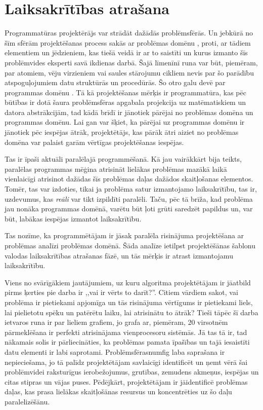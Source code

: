 \section{Laiksakrītības atrašana}
Programmatūras projektērājs var strādāt dažādās problēmsfērās. Un jebkūrā no
šīm sfērām projektēšanas process sakās ar problēmas domēnu ,
proti, ar tādiem elementiem un jēdzieniem, kas
tiešā veidā ir ar to saistīti un kurus izmanto šīs problēmvides eksperti savā
ikdienas darbā. Šajā līmenīnī runa var būt, piemēram, par atomiem, vēju virzieniem
vai saules stārojumu cikliem nevis par šo parādību atspoguļojumiem datu
struktūrās un procedūrās. Šo otro galu devē par programmas domēnu . Tā kā projektēšanas mērķis ir programmatūra, kas pēc būtības ir
dotā šaura problēmsfēras apgabala projekcija uz matēmatiskiem un datora abstrākcijām,
tad kādā brīdī ir jānotiek pārējai no problēmas domēna un programmas domēnu.
Lai gan var šķiet, ka pārējai uz programmas domēnu ir jānotiek pēc iespējas
ātrāk, projektētājs, kas pārāk ātri aiziet no problēmas domēna var palaist garām
vērtīgas projektēšanas iespējas.

Tas ir īpaši aktuāli paralēlajā programmēšanā. Kā jau vairākkārt bija teikts,
paralēlas programmas mēģina atrisināt
lielākas problēmas mazākā laikā vienlaicīgi atrisinot dažādas šīs problēmas daļas
dažādos skaitļošanas elementos. Tomēr, tas var izdoties, tikai ja problēma satur
izmantojamo laiksakrītību, tas ir, uzdevumus, kas \emph{reāli} var tikt izpildīti paralēli.
Taču, pēc tā brīža, kad problēma jau nonāka programmas domēnā, varētu būt ļoti grūti
saredzēt papildus un, var būt, labākas iespējas izmantot laiksakrītību.

Tas nozīme, ka programmētājam ir jāsak paralēla risinājuma projektēšana ar problēmas
analīzi problēmas domēnā. Šāda analīze ietilpst projektēšānas šablonu valodas
laiksakrītības atrašanas fāzē, un tās mērķis ir atrast izmantojamu laiksakrītību.

Viens no svārīgākiem jautājumiem, uz kuru algoritma projektētājam ir jāatbild
pirms ķerties pie darba ir ,,vai ir vērts to darīt?''. Citiem vārdiem sakot,
vai problēma ir pietiekami apjomīga un tās risinājuma vērtīgums ir pietiekami liels,
lai pielietotu spēku un patērētu laiku, lai atrisinātu to ātrāk? Tieši tāpēc šī
darba ietvaros runa ir par lieliem grafiem, jo grafa ar, piemēram, 20 virsotnēm pārmeklēšana
ir perfekti atrisinājama vienprocesoru sistēmās. Jā tas tā ir, tad nākamais solis ir
pārliecināties, ka problēmas pamata īpašības un tajā iesaistīti datu elementi ir
labi saprotami. Problēmsfērasnumfig laba saprašana ir nepieciešama, jo tā palīdz projektētājam
savlaicīgi identificēt un ņemt vērā šai problēmvidei raksturīgus ierobežojumus,
grutības, zemudens akmeņus, iespējas un citas stipras un vājas puses. Pēdējkārt, projektētājam ir
jāidentificē problēmas daļas, kas prasa lielākas skaitļošānas resursus un koncentrēties
uz šo daļu paralelizēšānu.

